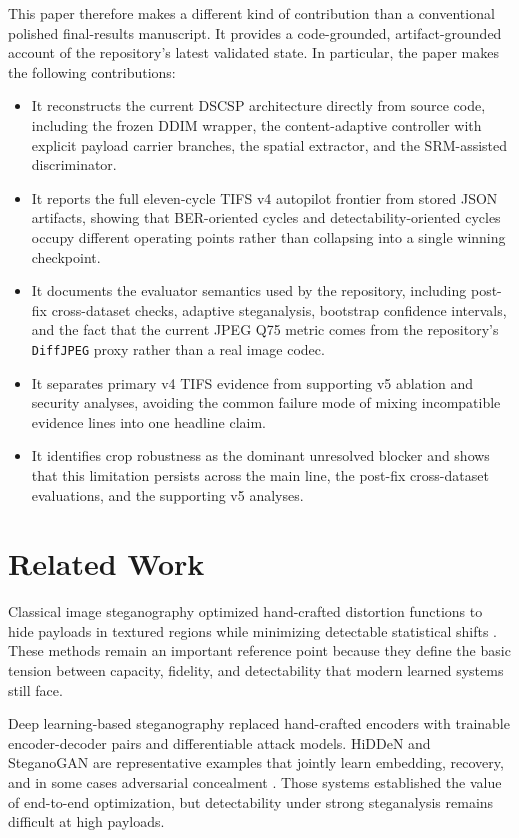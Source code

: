 \documentclass[journal]{IEEEtran}
\begin{document}
This paper therefore makes a different kind of contribution than a conventional polished final-results manuscript. It provides a code-grounded, artifact-grounded account of the repository's latest validated state. In particular, the paper makes the following contributions:
\begin{itemize}
    \item It reconstructs the current DSCSP architecture directly from source code, including the frozen DDIM wrapper, the content-adaptive controller with explicit payload carrier branches, the spatial extractor, and the SRM-assisted discriminator.
    \item It reports the full eleven-cycle TIFS v4 autopilot frontier from stored JSON artifacts, showing that BER-oriented cycles and detectability-oriented cycles occupy different operating points rather than collapsing into a single winning checkpoint.
    \item It documents the evaluator semantics used by the repository, including post-fix cross-dataset checks, adaptive steganalysis, bootstrap confidence intervals, and the fact that the current JPEG Q75 metric comes from the repository's \texttt{DiffJPEG} proxy rather than a real image codec.
    \item It separates primary v4 TIFS evidence from supporting v5 ablation and security analyses, avoiding the common failure mode of mixing incompatible evidence lines into one headline claim.
    \item It identifies crop robustness as the dominant unresolved blocker and shows that this limitation persists across the main line, the post-fix cross-dataset evaluations, and the supporting v5 analyses.
\end{itemize}

\section{Related Work}
Classical image steganography optimized hand-crafted distortion functions to hide payloads in textured regions while minimizing detectable statistical shifts \cite{cox2007digital,pevny2010using,holub2012designing,holub2014universal}. These methods remain an important reference point because they define the basic tension between capacity, fidelity, and detectability that modern learned systems still face.

Deep learning-based steganography replaced hand-crafted encoders with trainable encoder-decoder pairs and differentiable attack models. HiDDeN and SteganoGAN are representative examples that jointly learn embedding, recovery, and in some cases adversarial concealment \cite{zhu2018hidden,zhang2019steganogan}. Those systems established the value of end-to-end optimization, but detectability under strong steganalysis remains difficult at high payloads.
\end{document}
